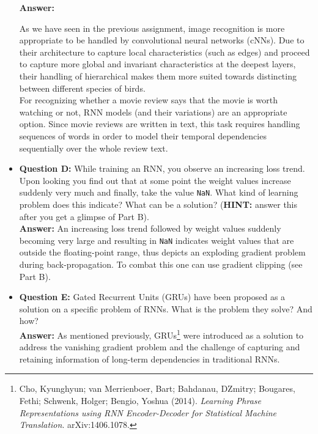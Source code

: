 \documentclass{article}
\def\code#1{\texttt{#1}}
\begin{document}
\begin{itemize}
	\textbf{Answer:} 
	
	As we have seen in the previous assignment, image recognition is more appropriate to be handled by convolutional neural networks (cNNs). Due to their architecture to capture local characteristics (such as edges) and proceed to capture more global and invariant characteristics at the deepest layers, their handling of hierarchical makes them more suited towards distincting between different species of birds. \\ 
	
	For recognizing whether a movie review says that the movie is worth watching or not, RNN models (and their variations) are an appropriate option. Since movie reviews are written in text, this task requires handling sequences of words in order to model their temporal dependencies sequentially over the whole review text.
	
	\item \textbf{Question D:} While training an RNN, you observe an increasing loss trend. Upon looking you find out that at some point the weight values increase suddenly very much and finally, take the value \code{NaN}. What kind of learning problem does this indicate? What can be a solution? (\textbf{HINT:} answer this after you get a glimpse of Part B). \\
	
    \textbf{Answer:} An increasing loss trend followed by weight values suddenly becoming very large and resulting in \code{NaN} indicates weight values that are outside the floating-point range, thus depicts an exploding gradient problem during back-propagation. To combat this one can use gradient clipping (see Part B).
	
	\item \textbf{Question E:} Gated Recurrent Units (GRUs) have been proposed as a solution on a specific problem of RNNs. What is the problem they solve? And how? \\
	
	\textbf{Answer:} As mentioned previously, GRUs\footnote{Cho, Kyunghyun; van Merrienboer, Bart; Bahdanau, DZmitry; Bougares, Fethi; Schwenk, Holger; Bengio, Yoshua (2014). \textit{Learning Phrase Representations using RNN Encoder-Decoder for Statistical Machine Translation}. arXiv:1406.1078.} were introduced as a solution to address the vanishing gradient problem and the challenge of capturing and retaining information of long-term dependencies in traditional RNNs. \\
	

\end{itemize}
\end{document}
